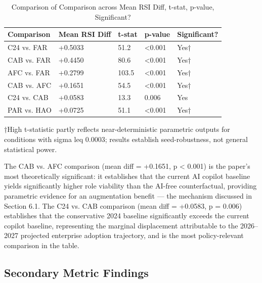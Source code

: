 \documentclass[10pt, conference]{IEEEtran}
\begin{document}
\begin{table}[ht]
\centering
\caption{Comparison of Comparison across Mean RSI Diff, t-stat, p-value, Significant?}
\label{tab:6}
\begin{tabular}{lllll}
\toprule
\textbf{Comparison} & \textbf{Mean RSI Diff} & \textbf{t-stat} & \textbf{p-value} & \textbf{Significant?} \\
\midrule
C24 vs. FAR & +0.5033 & 51.2 & <0.001 & Yes† \\
CAB vs. FAR & +0.4450 & 80.6 & <0.001 & Yes† \\
AFC vs. FAR & +0.2799 & 103.5 & <0.001 & Yes† \\
CAB vs. AFC & +0.1651 & 54.5 & <0.001 & Yes† \\
C24 vs. CAB & +0.0583 & 13.3 & 0.006 & Yes \\
PAR vs. HAO & +0.0725 & 51.1 & <0.001 & Yes† \\
\bottomrule
\end{tabular}
\end{table}

†High t-statistic partly reflects near-deterministic parametric outputs for conditions with sigma leq 0.0003; results establish seed-robustness, not general statistical power.

The CAB vs. AFC comparison (mean diff = +0.1651, p < 0.001) is the paper's most theoretically significant: it establishes that the current AI copilot baseline yields significantly higher role viability than the AI-free counterfactual, providing parametric evidence for an augmentation benefit --- the mechanism discussed in Section 6.1. The C24 vs. CAB comparison (mean diff = +0.0583, p = 0.006) establishes that the conservative 2024 baseline significantly exceeds the current copilot baseline, representing the marginal displacement attributable to the 2026--2027 projected enterprise adoption trajectory, and is the most policy-relevant comparison in the table.

\subsection{Secondary Metric Findings}

\label{sec:secondary_metric_findings}
\end{document}
